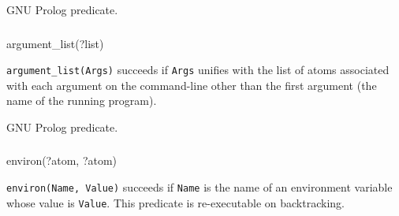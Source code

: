 \Portability

GNU Prolog predicate.

\subsubsection{\label{argument-list/1}}

\begin{TemplatesOneCol}
argument\_list(?list)

\end{TemplatesOneCol}

\Description

\texttt{argument\_list(Args)} succeeds if \texttt{Args} unifies with the
list of atoms associated with each argument on the command-line other than the
first argument (the name of the running program).

\begin{PlErrors}


\end{PlErrors}

\Portability

GNU Prolog predicate.

\subsubsection{}

\begin{TemplatesOneCol}
environ(?atom, ?atom)

\end{TemplatesOneCol}

\Description

\texttt{environ(Name, Value)} succeeds if \texttt{Name} is the name of an
environment variable whose value is \texttt{Value}. This predicate is
re-executable on backtracking.

\begin{PlErrors}



\end{PlErrors}

\Portability

